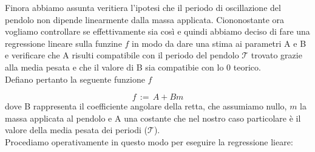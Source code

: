 Finora abbiamo assunta veritiera l'ipotesi che il periodo di oscillazione del pendolo non dipende linearmente dalla massa applicata. Ciononostante ora vogliamo controllare se effettivamente sia così e quindi abbiamo deciso di fare una regressione lineare sulla funzine $f$ in modo da dare una stima ai parametri A e B e verificare che A risulti compatibile con il periodo del pendolo $\mathcal{T}$ trovato grazie alla media pesata e che il valore di B sia compatibie con lo 0 teorico.\\

Defiano pertanto la seguente funzione $f$

\begin{equation}
	f \,:=\, A + B m 
\end{equation}
%
dove B rappresenta il coefficiente angolare della retta, che assumiamo nullo, $m$ la massa applicata al pendolo e A una costante che nel nostro caso particolare è il valore della media pesata dei periodi ($\mathcal{T}$).\\
Procediamo operativamente in questo modo per eseguire la regressione lieare:

